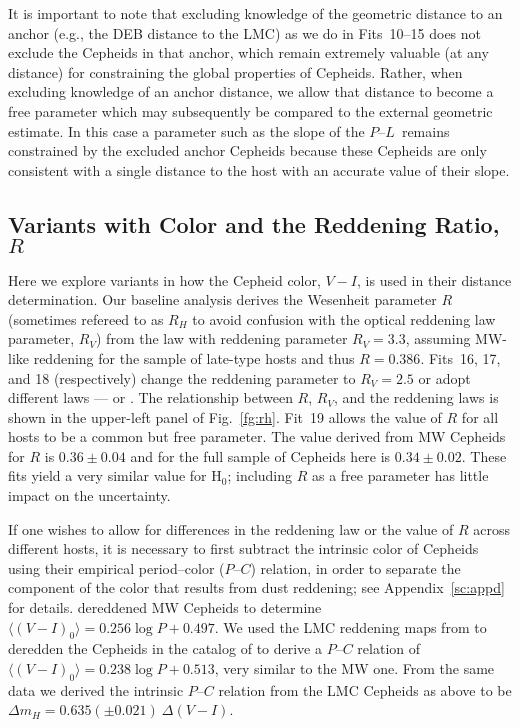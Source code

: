 \documentclass[12pt]{aastex631}
\newcommand{\PLs}{$P$--$L$\ }
\begin{document}
It is important to note that excluding knowledge of the geometric distance to an anchor (e.g., the DEB distance to the LMC) as we do in Fits~10--15 does not exclude the Cepheids in that anchor, which remain extremely valuable (at any distance) for constraining the global properties of Cepheids. Rather, when excluding knowledge of an anchor distance, we allow that distance to become a free parameter which may subsequently be compared to the external geometric estimate.  In this case a parameter such as the slope of the \PLs remains constrained by the excluded anchor Cepheids because these Cepheids are only consistent with a single distance to the host with an accurate value of their slope.  

\subsection{Variants with Color and the Reddening Ratio, $R$\label{sc:6.3}}
  
Here we explore variants in how the Cepheid color, $V\!-\!I$, is used in their distance determination.  Our baseline analysis derives the Wesenheit parameter $R$ (sometimes refereed to as $R_H$ to avoid confusion with the optical reddening law parameter, $R_V$) from the \citet{Fitzpatrick:1999} law with reddening parameter $R_V=3.3$, assuming MW-like reddening for the sample of late-type hosts and thus $R=0.386$.  Fits~16, 17, and 18 (respectively) change the reddening parameter to $R_V=2.5$ or adopt different laws --- \citet[][with $R_V=3.1$]{cardelli89} or \citet[][appropriate for the inner halo]{Nataf:2016}.  The relationship between $R$, $R_V$, and the reddening laws is shown in the upper-left panel of Fig.~\ref{fg:rh}.  Fit~19 allows the value of $R$ for all hosts to be a common but free parameter.  The value derived from MW Cepheids for $R$ is  $0.36\pm0.04$ \citep{Riess:2021} and for the full sample of Cepheids here is $0.34\pm0.02$.  These fits yield a very similar value for H$_0$; including $R$ as a free parameter has little impact on the uncertainty.  
  
If one wishes to allow for differences in the reddening law or the value of $R$ across different hosts, it is necessary to first subtract the intrinsic color of Cepheids using their empirical period--color ($P$--$C$) relation, in order to separate the component of the color that results from dust reddening; see Appendix~\ref{sc:appd} for details.  \citet{sandage04} dereddened MW Cepheids to determine $\langle(V\!-\!I)_0\rangle=0.256\log P+0.497$.  We used the LMC reddening maps from \citet{Skowron:2021} to deredden the Cepheids in the catalog of \citet{Macri:2015} to derive a $P$--$C$ relation of $\langle(V\!-\!I)_0\rangle=0.238\log P+0.513$, very similar to the MW one. From the same data we derived the intrinsic $P$--$C$ relation from the LMC Cepheids as above to be $\Delta m_H=0.635(\pm 0.021)\ \Delta({V\!-\!I})$.
\end{document}
